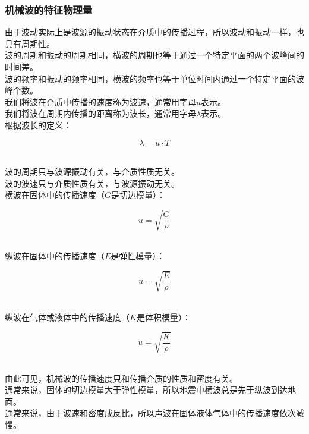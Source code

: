 \documentclass[UTF8]{ctexart}
\begin{document}
\subsubsection{机械波的特征物理量}
    由于波动实际上是波源的振动状态在介质中的传播过程，所以波动和振动一样，也具有周期性。\\[3mm]
    波的周期和振动的周期相同，横波的周期也等于通过一个特定平面的两个波峰间的时间差。\\[3mm]
    波的频率和振动的频率相同，横波的频率也等于单位时间内通过一个特定平面的波峰个数。\\[5mm]
    我们将波在介质中传播的速度称为波速，通常用字母$u$表示。\\[3mm]
    我们将波在周期内传播的距离称为波长，通常用字母$\lambda$表示。\\[5mm]
    根据波长的定义：
    \begin{large}
        \begin{equation*}
            \lambda=u\cdot T
        \end{equation*}
    \end{large}\\
    波的周期只与波源振动有关，与介质性质无关。\\[3mm]
    波的波速只与介质性质有关，与波源振动无关。\\[3mm]
    横波在固体中的传播速度（$G$是切边模量）：
    \begin{large}
        \begin{equation*}
            u=\sqrt{\frac{G}{\rho}}
        \end{equation*}
    \end{large}\\
    纵波在固体中的传播速度（$E$是弹性模量）：
    \begin{large}
        \begin{equation*}
            u=\sqrt{\frac{E}{\rho}}
        \end{equation*}
    \end{large}\\
    纵波在气体或液体中的传播速度（$K$是体积模量）：
    \begin{large}
        \begin{equation*}
            u=\sqrt{\frac{K}{\rho}}
        \end{equation*}
    \end{large}\\
    由此可见，机械波的传播速度只和传播介质的性质和密度有关。\\[3mm]
    通常来说，固体的切边模量大于弹性模量，所以地震中横波总是先于纵波到达地面。\\[3mm]
    通常来说，由于波速和密度成反比，所以声波在固体液体气体中的传播速度依次减慢。
\end{document}
